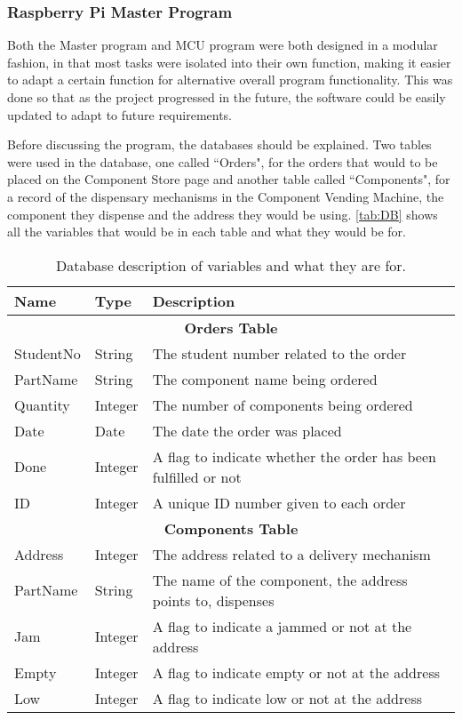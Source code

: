 \documentclass[a4paper,11pt]{article}
\numberwithin{figure}{section}
\numberwithin{table}{section}
\begin{document}
\subsubsection{Raspberry Pi Master Program}

Both the Master program and MCU program were both designed in a modular fashion, in that most tasks were isolated into their own function, making it easier to adapt a certain function for alternative overall program functionality. This was done so that as the project progressed in the future, the software could be easily updated to adapt to future requirements.

Before discussing the program, the databases should be explained. Two tables were used in the database, one called ``Orders", for the orders that would to be placed on the Component Store page and another table called ``Components", for a record of the dispensary mechanisms in the Component Vending Machine, the component they dispense and the address they would be using. \autoref{tab:DB} shows all the variables that would be in each table and what they would be for.

		\begin{table}[!ht]
			\centering
			\begin{tabular}{| m{2cm} | m{2cm}| m{10cm} |}
			\hline 
			Name & Type & Description\\
			\hline
			\multicolumn{3}{|c|}{\bfseries Orders Table}\\
			\hline	
			StudentNo & String & The student number related to the order \\
			\hline
			PartName & String & The component name being ordered \\
			\hline
			Quantity & Integer & The number of components being ordered \\
			\hline			
			Date & Date & The date the order was placed \\
			\hline
			Done & Integer & A flag to indicate whether the order has been fulfilled or not\\
			\hline
			ID & Integer & A unique ID number given to each order\\
			\hline
			\multicolumn{3}{|c|}{\bfseries Components Table}\\
			\hline
			Address & Integer & The address related to a delivery mechanism \\
			\hline
			PartName & String & The name of the component, the address points to, dispenses \\
			\hline
			Jam & Integer & A flag to indicate a jammed or not at the address\\
			\hline
			Empty & Integer & A flag to indicate empty or not at the address\\
			\hline
			Low & Integer & A flag to indicate low or not at the address\\
			\hline
			\end{tabular}
		\caption{Database description of variables and what they are for. \label{tab:DB}}
		\end{table}
\end{document}
